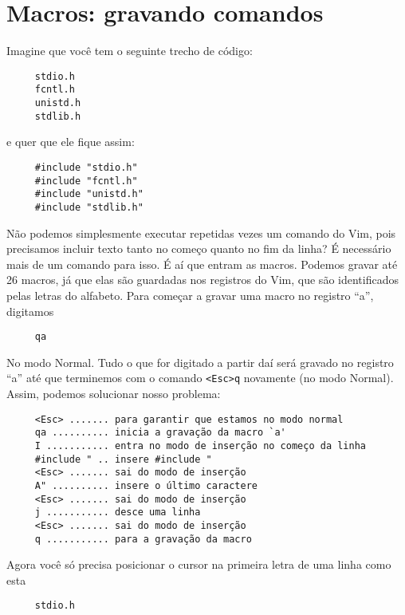 \section{Macros: gravando comandos}\label{Macros: gravando comandos}

Imagine que você tem o seguinte trecho de código:

\begin{verbatim}
     stdio.h
     fcntl.h
     unistd.h
     stdlib.h
\end{verbatim}

e quer que ele fique assim:

\begin{verbatim}
     #include "stdio.h"
     #include "fcntl.h"
     #include "unistd.h"
     #include "stdlib.h"
\end{verbatim}

Não podemos simplesmente executar repetidas vezes um comando do Vim, pois
precisamos incluir texto tanto no começo quanto no fim da linha?  É necessário
mais de um comando para isso.  É aí que entram as macros. Podemos gravar até 26
macros, já que elas são guardadas nos registros do Vim, que são identificados
pelas letras do alfabeto. Para começar a gravar uma macro no registro ``a'',
digitamos

\begin{verbatim}
     qa
\end{verbatim}

No modo Normal. Tudo o que for digitado a partir daí será gravado no
registro ``a'' até que terminemos com o comando
\verb|<Esc>q| novamente (no modo Normal). Assim,
podemos solucionar nosso problema:

\begin{verbatim}
     <Esc> ....... para garantir que estamos no modo normal
     qa .......... inicia a gravação da macro `a'
     I ........... entra no modo de inserção no começo da linha
     #include " .. insere #include "
     <Esc> ....... sai do modo de inserção
     A" .......... insere o último caractere
     <Esc> ....... sai do modo de inserção
     j ........... desce uma linha
     <Esc> ....... sai do modo de inserção
     q ........... para a gravação da macro
\end{verbatim}

Agora você só precisa posicionar o cursor na primeira letra de uma linha como esta

\begin{verbatim}
     stdio.h
\end{verbatim}

